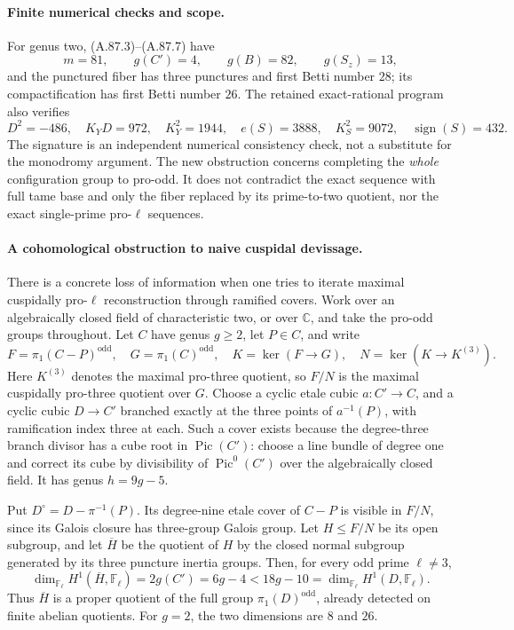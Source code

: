 \documentclass[11pt]{article}
\begin{document}
\paragraph{Finite numerical checks and scope.}
For genus two, (A.87.3)--(A.87.7) have
\[
 m=81,\qquad g(C')=4,\qquad g(B)=82,
 \qquad g(S_z)=13,
\]
and the punctured fiber has three punctures and first Betti
number \(28\); its compactification has first Betti number
\(26\). The retained exact-rational program
 also verifies
\[
 D^2=-486,\quad K_YD=972,\quad K_Y^2=1944,
 \quad e(S)=3888,\quad K_S^2=9072,\quad
 \operatorname{sign}(S)=432.
                                                               \tag{A.87.10}
\]
The signature is an independent numerical consistency check,
not a substitute for the monodromy argument. The new obstruction
concerns completing the \emph{whole} configuration group to
pro-odd. It does not contradict the exact sequence with full
tame base and only the fiber replaced by its prime-to-two
quotient, nor the exact single-prime pro-\(\ell\) sequences.

\paragraph{A cohomological obstruction to naive cuspidal devissage.}
There is a concrete loss of information when one tries to
iterate maximal cuspidally pro-\(\ell\) reconstruction through
ramified covers. Work over an algebraically closed field of
characteristic two, or over \(\mathbb C\), and take the
pro-odd groups throughout. Let \(C\) have genus \(g\geq2\),
let \(P\in C\), and write
\[
 F=\pi_1(C-P)^{\mathrm{odd}},\quad
 G=\pi_1(C)^{\mathrm{odd}},\quad K=\ker(F\to G),
 \quad N=\ker(K\to K^{(3)}).
\]
Here \(K^{(3)}\) denotes the maximal pro-three quotient,
so \(F/N\) is the maximal cuspidally pro-three quotient over
\(G\). Choose a cyclic etale cubic \(a:C'\to C\), and a
cyclic cubic \(D\to C'\) branched exactly at the three
points of \(a^{-1}(P)\), with ramification index three at
each. Such a cover exists because the degree-three branch
divisor has a cube root in \(\operatorname{Pic}(C')\):
choose a line bundle of degree one and correct its cube
by divisibility of \(\operatorname{Pic}^0(C')\) over the
algebraically closed field.
It has genus \(h=9g-5\).

Put \(D^\circ=D-\pi^{-1}(P)\). Its degree-nine etale cover
of \(C-P\) is visible in \(F/N\), since its Galois closure
has three-group Galois group. Let \(H\leq F/N\) be its
open subgroup, and let \(\overline H\) be the quotient of
\(H\) by the closed normal subgroup generated by its three
puncture inertia groups. Then, for every odd prime
\(\ell\ne3\),
\[
 \dim_{\mathbb F_\ell}H^1(\overline H,\mathbb F_\ell)
       =2g(C')=6g-4
       <18g-10
       =\dim_{\mathbb F_\ell}H^1(D,\mathbb F_\ell).
                                                               \tag{A.87.11}
\]
Thus \(\overline H\) is a proper quotient of the full
group \(\pi_1(D)^{\mathrm{odd}}\), already detected on
finite abelian quotients. For \(g=2\), the two dimensions
are \(8\) and \(26\).
\end{document}
